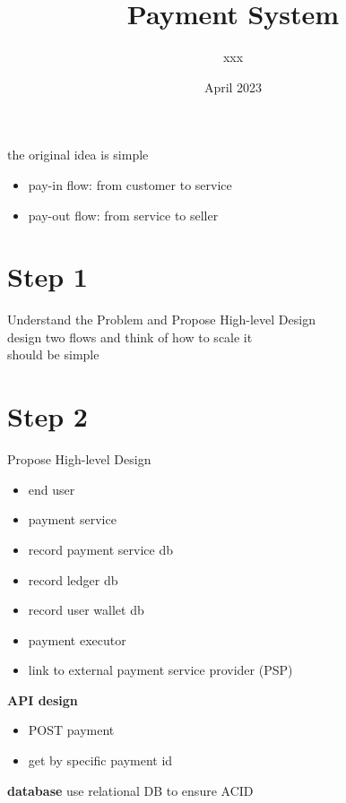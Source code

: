 \documentclass{article}
\title{Payment System}
\author{xxx}
\date{April 2023}
\begin{document}
\maketitle
the original idea is simple
\begin{itemize}
    \item pay-in flow: from customer to service
    \item pay-out flow: from service to seller
\end{itemize}
\section{Step 1}
Understand the Problem and Propose High-level Design\\
design two flows and think of how to scale it\\
should be simple
\section{Step 2}
Propose High-level Design\\
\begin{itemize}
    \item end user
    \item payment service
    \item record payment service db
    \item record ledger db
    \item record user wallet db
    \item payment executor
    \item link to external payment service provider (PSP)
\end{itemize}
\textbf{API design}
\begin{itemize}
    \item POST payment
    \item get by specific payment id
\end{itemize}
\textbf{database}
use relational DB to ensure ACID\\
\end{document}
